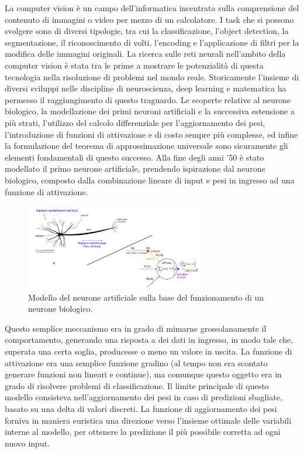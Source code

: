 La computer vision è un campo dell'informatica incentrata sulla comprensione del contenuto di immagini o video per mezzo di un calcolatore. I task che si possono svolgere sono di diversi tipologie, tra cui la classificazione, l'object detection, la segmentazione, il riconoscimento di volti, l'encoding e l'applicazione di filtri per la modifica delle immagini originali. La ricerca sulle reti neurali nell'ambito della computer vision è stata tra le prime a mostrare le potenzialità di questa tecnologia nella risoluzione di problemi nel mondo reale. Storicamente l'insieme di diversi sviluppi nelle discipline di neuroscienza, deep learning e matematica ha permesso il raggiungimento di questo traguardo. Le scoperte relative al neurone biologico, la modellazione dei primi neuroni artificiali e la successiva estensione a più strati, l'utilizzo del calcolo differenziale per l'aggiornamento dei pesi, l'introduzione di funzioni di attivazione e di costo sempre più complesse, ed infine la formulazione del teorema di approssimazione universale sono sicuramente gli elementi fondamentali di questo successo. Alla fine degli anni '50 è stato modellato il primo neurone artificiale, prendendo ispirazione dal neurone biologico, composto dalla combinazione lineare di input e pesi in ingresso ad una funzione di attivazione.

\begin{figure}[htbp]
    \centering
    \includegraphics[width=0.7\textwidth]{figures/perceptron.png}
    \caption{Modello del neurone artificiale sulla base del funzionamento di un neurone biologico.}
    \label{fig:perceptron}
\end{figure}

Questo semplice meccanismo era in grado di mimarne grossolanamente il comportamento, generando una risposta a dei dati in ingresso, in modo tale che, superata una certa soglia, producesse o meno un valore in uscita. La funzione di attivazione era una semplice funzione gradino (al tempo non era scontato generare funzioni non lineari e continue), ma comunque questo oggetto era in grado di risolvere problemi di classificazione. Il limite principale di questo modello consisteva nell'aggiornamento dei pesi in caso di predizioni sbagliate, basato su una delta di valori discreti. La funzione di aggiornamento dei pesi forniva in maniera euristica una direzione verso l'insieme ottimale delle variabili interne al modello, per ottenere la predizione il più possibile corretta ad ogni nuovo input. 

